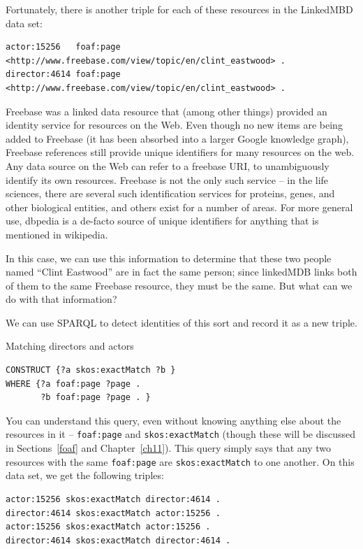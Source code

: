 \begin{challenge}
Fortunately, there is another triple for each of these resources in the
LinkedMBD data set:

\begin{lstlisting}
actor:15256   foaf:page  <http://www.freebase.com/view/topic/en/clint_eastwood> .
director:4614 foaf:page  <http://www.freebase.com/view/topic/en/clint_eastwood> .
\end{lstlisting}

Freebase was a linked data resource that (among other things) provided an
identity service for resources on the Web. Even though no new items are being added to Freebase
(it has been absorbed into a larger Google knowledge graph), Freebase references still provide unique
identifiers for many resources on the web. 
Any data source on the Web
can refer to a freebase URI, to unambiguously identify its own
resources. Freebase is not the only such service -- in the life
sciences, there are several such identification services for proteins,
genes, and other biological entities, and others exist for a number of
areas.  For more general use, dbpedia is a de-facto source of unique identifiers for anything that
is mentioned in wikipedia. 

In this case, we can use this information to determine that these two
people named ``Clint Eastwood'' are in fact the same person; since
linkedMDB links both of them to the same Freebase resource, they must be
the same. But what can we do with that information?

We can use SPARQL to detect identities of this sort and record it as a
new triple.

\begin{query}Matching directors and actors\end{query}
\begin{lstlisting}
CONSTRUCT {?a skos:exactMatch ?b }
WHERE {?a foaf:page ?page .
       ?b foaf:page ?page . }
\end{lstlisting}

You can understand this query, even without knowing anything else about
the resources in it -- \texttt{foaf:page} and \texttt{skos:exactMatch} (though these will
be discussed in Sections~\ref{foaf} and Chapter~\ref{ch11}). This query simply says that any two
resources with the same \texttt{foaf:page} are \texttt{skos:exactMatch} to one another. On
this data set, we get the following triples:

\begin{lstlisting}
actor:15256 skos:exactMatch director:4614 .
director:4614 skos:exactMatch actor:15256 .
actor:15256 skos:exactMatch actor:15256 .
director:4614 skos:exactMatch director:4614 .
\end{lstlisting}


\end{challenge}
